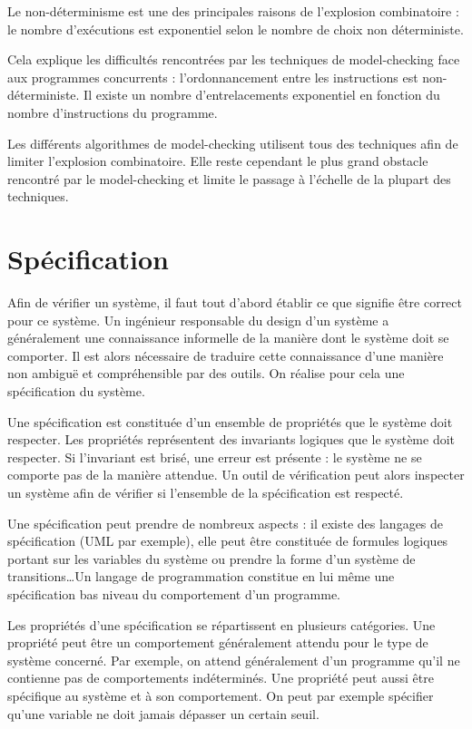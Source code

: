 Le non-déterminisme est une des principales raisons de l'explosion combinatoire :
le nombre d'exécutions est exponentiel selon le nombre de choix non déterministe.

Cela explique les difficultés rencontrées par les techniques de model-checking
face aux programmes concurrents : l'ordonnancement entre les instructions est
non-déterministe. Il existe un nombre d'entrelacements exponentiel en fonction
du nombre d'instructions du programme.

Les différents algorithmes de model-checking utilisent tous des
techniques afin de limiter l'explosion combinatoire. Elle reste
cependant le plus grand obstacle rencontré par le model-checking et
limite le passage à l'échelle de la plupart des techniques.

\section{Spécification}\label{sec:specification}

Afin de vérifier un système, il faut tout d'abord établir ce que signifie être
correct pour ce système. Un ingénieur responsable du design d'un système a
généralement une connaissance informelle de la manière dont le système doit se
comporter. Il est alors nécessaire de traduire cette connaissance d'une manière
non ambiguë et compréhensible par des outils. On réalise pour cela une
spécification du système.

Une spécification est constituée d'un ensemble de propriétés que le système doit
respecter. Les propriétés représentent des invariants logiques que le système
doit respecter. Si l'invariant est brisé, une erreur est présente : le système ne
se comporte pas de la manière attendue. Un outil de vérification peut alors inspecter
un système afin de vérifier si l'ensemble de la spécification est respecté.

Une spécification peut prendre de nombreux aspects : il existe des langages de
spécification (UML par exemple), elle peut être constituée de formules logiques portant
sur les variables du système ou prendre la forme d'un système de
transitions\dots Un langage de programmation constitue en lui même une
spécification bas niveau du comportement d'un programme.

Les propriétés d'une spécification se répartissent en plusieurs catégories. Une
propriété peut être un comportement généralement attendu pour le type de système
concerné. Par exemple, on attend généralement d'un programme qu'il ne contienne
pas de comportements indéterminés. Une propriété peut aussi être spécifique au
système et à son comportement. On peut par exemple spécifier qu'une variable ne
doit jamais dépasser un certain seuil.


